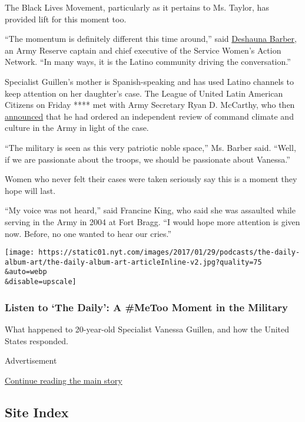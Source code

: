 The Black Lives Movement, particularly as it pertains to Ms. Taylor, has
provided lift for this moment too.

``The momentum is definitely different this time around,'' said
\href{https://www.servicewomen.org/swan-updates/swan-names-new-ceo/}{Deshauna
Barber}, an Army Reserve captain and chief executive of the Service
Women's Action Network. ``In many ways, it is the Latino community
driving the conversation.''

Specialist Guillen's mother is Spanish-speaking and has used Latino
channels to keep attention on her daughter's case. The League of United
Latin American Citizens on Friday **** met with Army Secretary Ryan D.
McCarthy, who then
\href{https://www.military.com/daily-news/2020/07/10/army-secretary-orders-command-climate-review-amid-vanessa-guillen-investigation.html}{announced}
that he had ordered an independent review of command climate and culture
in the Army in light of the case.

``The military is seen as this very patriotic noble space,'' Ms. Barber
said. ``Well, if we are passionate about the troops, we should be
passionate about Vanessa.''

Women who never felt their cases were taken seriously say this is a
moment they hope will last.

``My voice was not heard,'' said Francine King, who said she was
assaulted while serving in the Army in 2004 at Fort Bragg. ``I would
hope more attention is given now. Before, no one wanted to hear our
cries.''

\texttt{[image: https://static01.nyt.com/images/2017/01/29/podcasts/the-daily-album-art/the-daily-album-art-articleInline-v2.jpg?quality=75\\\&auto=webp\\\&disable=upscale]}

\hypertarget{listen-to-the-daily-a-metoo-moment-in-the-military}{%
\subsubsection{Listen to `The Daily': A \#MeToo Moment in the
Military}\label{listen-to-the-daily-a-metoo-moment-in-the-military}}

What happened to 20-year-old Specialist Vanessa Guillen, and how the
United States responded.

Advertisement

\protect\hyperlink{after-bottom}{Continue reading the main story}

\hypertarget{site-index}{%
\subsection{Site Index}\label{site-index}}

